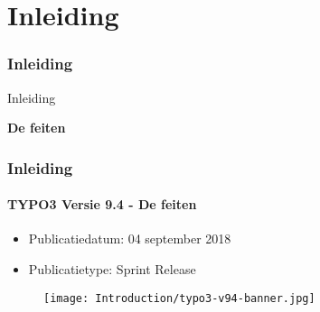 %


\section{Inleiding}
\begin{frame}[fragile]
	\frametitle{Inleiding}

	\begin{center}\huge{Inleiding}\end{center}
	\begin{center}\huge{\color{typo3darkgrey}\textbf{De feiten}}\end{center}

\end{frame}


\begin{frame}[fragile]
	\frametitle{Inleiding}
	\framesubtitle{TYPO3 Versie 9.4 - De feiten}

	\begin{itemize}
		\item Publicatiedatum: 04 september 2018
		\item Publicatietype: Sprint Release
	\end{itemize}

	\begin{figure}
		\texttt{[image: Introduction/typo3-v94-banner.jpg]}
	\end{figure}

\end{frame}


